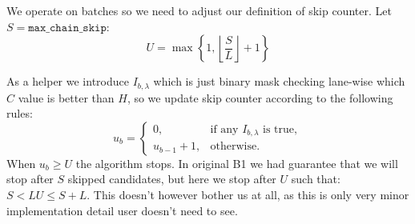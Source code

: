 


We operate on batches so we need to adjust our definition of skip counter.
Let \(S=\texttt{max\_chain\_skip}\):
\begin{equation}
 U=\max\!\left\{1,\left\lfloor\frac{S}{L}\right\rfloor+1\right\}
\label{eq:chaining-batch-limit}
\end{equation}

As a helper we introduce $I_{b,\lambda}$ which is just binary mask checking lane-wise which $C$ value is better than $H$, so we update skip counter according to the following rules:
\begin{equation}
 u_b=
 \begin{cases}
   0,&\text{if any }I_{b,\lambda}\text{ is true},\\
   u_{b-1}+1,&\text{otherwise.}
 \end{cases}
 \label{eq:chaining-b5-counter}
\end{equation}
When \(u_b\geq U\) the algorithm stops. In original B1 we had guarantee that we will stop after $S$ skipped candidates, but here we stop after $U$ such that: \(S<LU\leq S+L\). This doesn't however bother us at all, as this is only very minor implementation detail user doesn't need to see.

